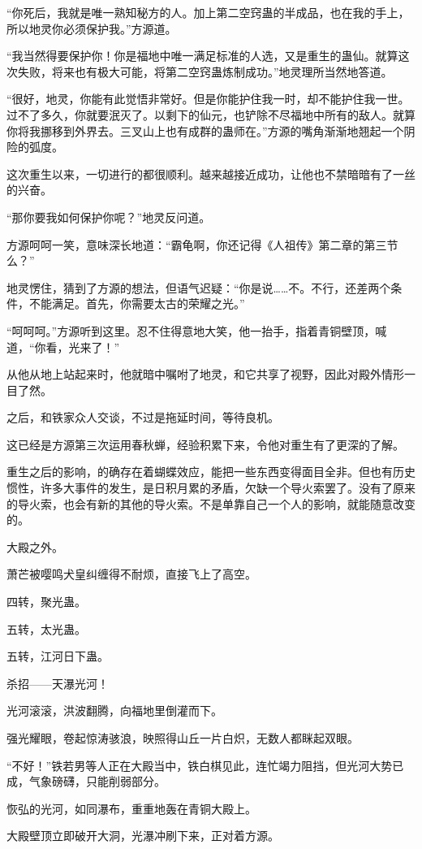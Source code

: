 \begin{this_body}
“你死后，我就是唯一熟知秘方的人。加上第二空窍蛊的半成品，也在我的手上，所以地灵你必须保护我。”方源道。

“我当然得要保护你！你是福地中唯一满足标准的人选，又是重生的蛊仙。就算这次失败，将来也有极大可能，将第二空窍蛊炼制成功。”地灵理所当然地答道。

“很好，地灵，你能有此觉悟非常好。但是你能护住我一时，却不能护住我一世。过不了多久，你就要泯灭了。以剩下的仙元，也铲除不尽福地中所有的敌人。就算你将我挪移到外界去。三叉山上也有成群的蛊师在。”方源的嘴角渐渐地翘起一个阴险的弧度。

这次重生以来，一切进行的都很顺利。越来越接近成功，让他也不禁暗暗有了一丝的兴奋。

“那你要我如何保护你呢？”地灵反问道。

方源呵呵一笑，意味深长地道：“霸龟啊，你还记得《人祖传》第二章的第三节么？”

地灵愣住，猜到了方源的想法，但语气迟疑：“你是说……不。不行，还差两个条件，不能满足。首先，你需要太古的荣耀之光。”

“呵呵呵。”方源听到这里。忍不住得意地大笑，他一抬手，指着青铜壁顶，喊道，“你看，光来了！”

从他从地上站起来时，他就暗中嘱咐了地灵，和它共享了视野，因此对殿外情形一目了然。

之后，和铁家众人交谈，不过是拖延时间，等待良机。

这已经是方源第三次运用春秋蝉，经验积累下来，令他对重生有了更深的了解。

重生之后的影响，的确存在着蝴蝶效应，能把一些东西变得面目全非。但也有历史惯性，许多大事件的发生，是日积月累的矛盾，欠缺一个导火索罢了。没有了原来的导火索，也会有新的其他的导火索。不是单靠自己一个人的影响，就能随意改变的。

大殿之外。

萧芒被嘤鸣犬皇纠缠得不耐烦，直接飞上了高空。

四转，聚光蛊。

五转，太光蛊。

五转，江河日下蛊。

杀招——天瀑光河！

光河滚滚，洪波翻腾，向福地里倒灌而下。

强光耀眼，卷起惊涛骇浪，映照得山丘一片白炽，无数人都眯起双眼。

“不好！”铁若男等人正在大殿当中，铁白棋见此，连忙竭力阻挡，但光河大势已成，气象磅礴，只能削弱部分。

恢弘的光河，如同瀑布，重重地轰在青铜大殿上。

大殿壁顶立即破开大洞，光瀑冲刷下来，正对着方源。


\end{this_body}
